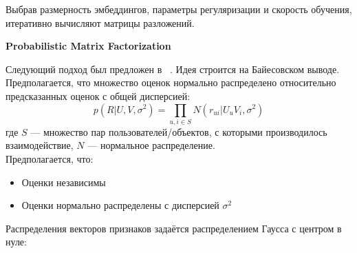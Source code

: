 Выбрав размерность эмбеддингов, параметры регуляризации и скорость обучения, итеративно вычисляют матрицы разложений.

\vspace{1em}
\textbf{Probabilistic Matrix Factorization}

Следующий подход был предложен в ~\cite{pmf}.
Идея строится на Байесовском выводе. Предполагается, что множество оценок нормально распределено относительно предсказанных оценок с общей дисперсией:
\begin{equation}\label{eq:ratings-distr}
        p(R|U, V, \sigma^2) = \prod_{u, i \in S}{N(r_{ui}|U_{u}V_{i}, \sigma^2)}
\end{equation}
где $S$ --- множество пар пользователей/объектов, с которыми производилось взаимодействие,
$N$ --- нормальное распределение.\\
Предполагается, что:
\begin{itemize}
\item Оценки независимы
\item Оценки нормально распределены с дисперсией $\sigma^2$
\end{itemize}
Распределения векторов признаков задаётся распределением Гаусса с центром в нуле:

